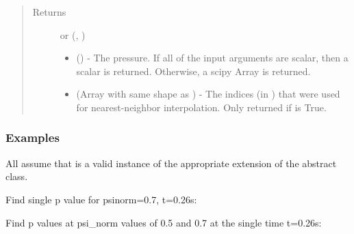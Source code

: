 \documentclass[letterpaper,10pt,english]{sphinxmanual}
\begin{document}
\begin{fulllineitems}
\begin{fulllineitems}
\begin{quote}
\begin{description}
\begin{itemize}
\end{itemize}

\item[{Returns}] \leavevmode

 or (, )
\begin{itemize}
\item {} 
 () - The pressure. If
all of the input arguments are scalar, then a scalar is returned.
Otherwise, a scipy Array is returned.

\item {} 
 (Array with same shape as ) - The indices
(in ) that were used for
nearest-neighbor interpolation. Only returned if  is
True.

\end{itemize}


\end{description}\end{quote}
\subsubsection*{Examples}

All assume that  is a valid instance of the appropriate
extension of the {\hyperref[\detokenize{eqtools:eqtools.core.Equilibrium}]{}} abstract class.

Find single p value for psinorm=0.7, t=0.26s:

\begin{sphinxVerbatim}[commandchars=\\\{\}]
   
\end{sphinxVerbatim}

Find p values at psi\_norm values of 0.5 and 0.7 at the single time
t=0.26s:

\begin{sphinxVerbatim}[commandchars=\\\{\}]
  \PYG{p}{[} \PYG{p}{]} 
\end{sphinxVerbatim}


\end{fulllineitems}
\end{fulllineitems}
\end{document}

